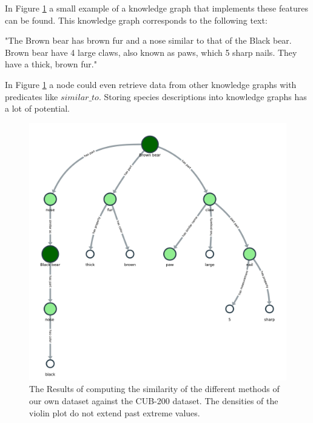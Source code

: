 \documentclass[a4paper, 12pt, oneside]{book} %
\begin{document}
In Figure \ref{fig:kngraph_rec} a small example of a knowledge graph that implements these features can be found.
This knowledge graph corresponds to the following text:
\newline

\noindent
"The Brown bear has brown fur and a nose similar to that of the Black bear. Brown bear have 4 large claws, also known as paws, which 5 sharp nails. They have a thick, brown fur."
\newline

\noindent
In Figure \ref{fig:kngraph_rec} a node could even retrieve data from other knowledge graphs with predicates like $similar\_to$.
Storing species descriptions into knowledge graphs has a lot of potential.

\begin{figure}[htpb]
 \centering
 \includegraphics[width=\textwidth]{figures/kngraph_rec.pdf}
 \caption[Knowledge Graph Future Example]{The Results of computing the similarity of the different methods of our own dataset against the CUB-200 dataset. The densities of the violin plot do not extend past extreme values.}
 \label{fig:kngraph_rec}
\end{figure}


\printbibliography
\newpage
\end{document}

